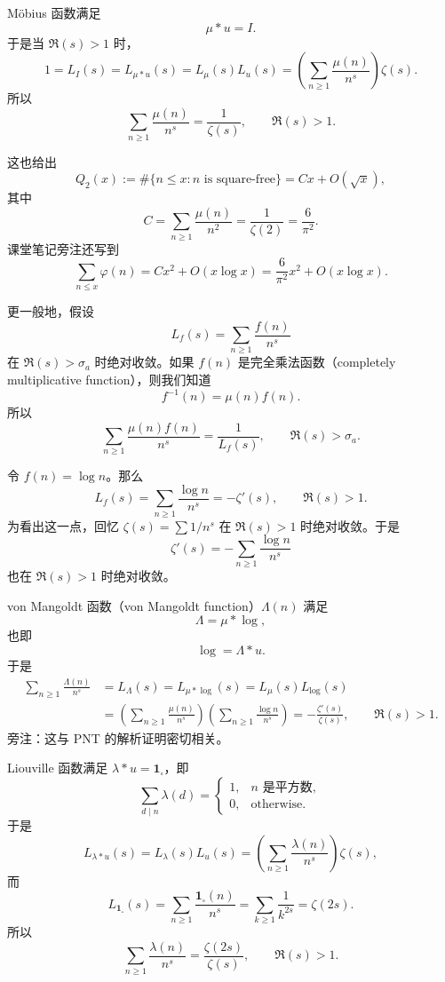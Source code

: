 \begin{example}
	Möbius 函数满足
	\[
		\mu*u=I.
	\]
	于是当 $\Re(s)>1$ 时，
	\[
		1=L_I(s)=L_{\mu*u}(s)=L_\mu(s)L_u(s)
		=
		\left(\sum_{n\geq 1}\frac{\mu(n)}{n^s}\right)\zeta(s).
	\]
	所以
	\[
		\sum_{n\geq 1}\frac{\mu(n)}{n^s}
		=
		\frac1{\zeta(s)},
		\qquad \Re(s)>1.
	\]
\end{example}

\begin{remark}
	这也给出
	\[
		Q_2(x):=\#\{n\leq x:n\text{ is square-free}\}
		=
		Cx+O(\sqrt x),
	\]
	其中
	\[
		C=\sum_{n\geq 1}\frac{\mu(n)}{n^2}
		=
		\frac1{\zeta(2)}
		=
		\frac6{\pi^2}.
	\]
	课堂笔记旁注还写到
	\[
		\sum_{n\leq x}\varphi(n)
		=
		Cx^2+O(x\log x)
		=
		\frac6{\pi^2}x^2+O(x\log x).
	\]
\end{remark}

更一般地，假设
\[
	L_f(s)=\sum_{n\geq 1}\frac{f(n)}{n^s}
\]
在 $\Re(s)>\sigma_a$ 时绝对收敛。如果 $f(n)$ 是完全乘法函数（completely multiplicative function），则我们知道
\[
	f^{-1}(n)=\mu(n)f(n).
\]
所以
\[
	\sum_{n\geq 1}\frac{\mu(n)f(n)}{n^s}
	=
	\frac1{L_f(s)},
	\qquad \Re(s)>\sigma_a.
\]

\begin{example}
	令 $f(n)=\log n$。那么
	\[
		L_f(s)=\sum_{n\geq 1}\frac{\log n}{n^s}
		=
		-\zeta'(s),
		\qquad \Re(s)>1.
	\]
	为看出这一点，回忆 $\zeta(s)=\sum 1/n^s$ 在 $\Re(s)>1$ 时绝对收敛。于是
	\[
		\zeta'(s)=-\sum_{n\geq 1}\frac{\log n}{n^s}
	\]
	也在 $\Re(s)>1$ 时绝对收敛。
\end{example}

\begin{example}
	von Mangoldt 函数（von Mangoldt function）$\Lambda(n)$ 满足
	\[
		\Lambda=\mu*\log,
	\]
	也即
	\[
		\log=\Lambda*u.
	\]
	于是
	\[
	\begin{aligned}
		\sum_{n\geq 1}\frac{\Lambda(n)}{n^s}
		&=
		L_\Lambda(s)
		=
		L_{\mu*\log}(s)
		=
		L_\mu(s)L_{\log}(s)\\
		&=
		\left(\sum_{n\geq 1}\frac{\mu(n)}{n^s}\right)
		\left(\sum_{n\geq 1}\frac{\log n}{n^s}\right)
		=
		-\frac{\zeta'(s)}{\zeta(s)},
		\qquad \Re(s)>1.
	\end{aligned}
	\]
	旁注：这与 PNT 的解析证明密切相关。
\end{example}

\begin{example}
	Liouville 函数满足 $\lambda*u=\mathbf 1_{\square}$，即
	\[
		\sum_{d\mid n}\lambda(d)
		=
		\begin{cases}
			1, & n\text{ 是平方数},\\
			0, & \text{otherwise}.
		\end{cases}
	\]
	于是
	\[
		L_{\lambda*u}(s)=L_\lambda(s)L_u(s)
		=
		\left(\sum_{n\geq 1}\frac{\lambda(n)}{n^s}\right)\zeta(s),
	\]
	而
	\[
		L_{\mathbf 1_{\square}}(s)
		=
		\sum_{n\geq 1}\frac{\mathbf 1_{\square}(n)}{n^s}
		=
		\sum_{k\geq 1}\frac1{k^{2s}}
		=
		\zeta(2s).
	\]
	所以
	\[
		\sum_{n\geq 1}\frac{\lambda(n)}{n^s}
		=
		\frac{\zeta(2s)}{\zeta(s)},
		\qquad \Re(s)>1.
	\]
\end{example}

